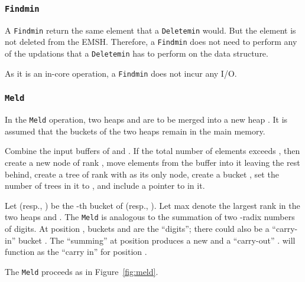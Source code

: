 \subsubsection{{\tt Findmin}}
A {\tt Findmin} return the same element that a {\tt Deletemin} would.
But the element is not deleted from the EMSH. 
Therefore, a {\tt Findmin} does not need to perform any of the updations
that a {\tt Deletemin} has to perform on the data structure.

As it is an in-core operation, a {\tt Findmin} does not incur any I/O. 

\subsubsection{{\tt Meld}}

In the {\tt Meld} operation, two heaps  and  are to be merged
        into a new heap .
It is assumed that the buckets of the two heaps remain in the main memory.

Combine the input buffers of  and .
If the total number of elements exceeds , then
create a new node  of rank , move  elements from the buffer into it
leaving the rest behind, create a tree  of rank  with  as its only node, 
create a bucket , set the number of trees in it to , and include a pointer to  in it.

Let  (resp., ) be the -th bucket of  (resp., ).
Let max denote the largest rank in the two heaps  and . The {\tt Meld} is analogous to
the summation of two -radix numbers of  digits. At position ,
buckets  and  are the ``digits''; there could also be
a ``carry-in'' bucket . The ``summing'' at position  produces a new
 and a ``carry-out'' . 
 will function as the ``carry in'' for position .

The {\tt Meld} proceeds as in Figure~\ref{fig:meld}.


